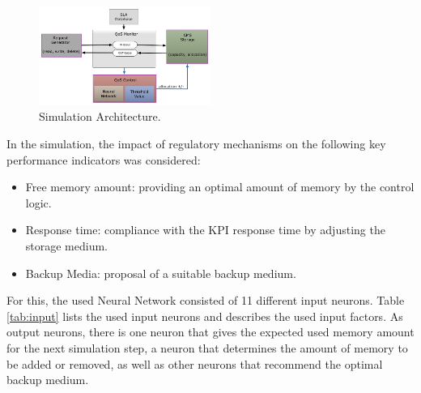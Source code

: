 \begin{figure}[ht]
	\begin{center}
		\includegraphics[width=0.5\textwidth]{fig/archi.png}
	\end{center}
	\caption{Simulation Architecture.}
	\label{fig:arch}
\end{figure}

In the simulation, the impact of regulatory mechanisms on the following key performance indicators was considered:
\begin{itemize}
	\item Free memory amount: providing an optimal amount of memory by the control logic. 
	\item Response time: compliance with the KPI response time by adjusting the storage medium. 
	\item Backup Media: proposal of a suitable backup medium.
\end{itemize}
For this, the used Neural Network consisted of  11 different input neurons. Table \ref{tab:input} lists the used input neurons and describes the used input factors. As output neurons, there is one neuron that gives the expected used memory amount for the next simulation step, a neuron that determines the amount of memory to be added or removed, as well as other neurons that recommend the optimal backup medium.

